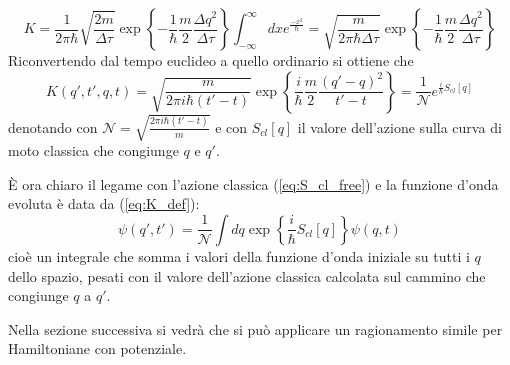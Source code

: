 $$
K = \frac{1}{2\pi\hbar}\sqrt{\frac{2m}{\Delta\tau}}\exp\left\{-\frac{1}{\hbar}\frac{m}{2}\frac{\Delta q^2}
{\Delta\tau} \right\} \int_{-\infty}^{\infty}dx e^{\frac{-x^2}{\hbar}} = \sqrt{\frac{m}{2\pi\hbar\Delta\tau}}
\exp\left\{-\frac{1}{\hbar}\frac{m}{2}\frac{\Delta q^2}{\Delta\tau}\right\}
$$
Riconvertendo dal tempo euclideo a quello ordinario si ottiene che
\begin{equation}
K(q',t',q,t) = \sqrt{\frac{m}{2\pi i\hbar(t'-t)}}\exp\left\{\frac{i}{\hbar}\frac{m}{2}
\frac{(q'-q)^2}{t'-t}\right\} = \frac{1}{\mathcal{N}}e^{\frac{i}{\hbar}S_{cl}[q]}
\label{eq:K_free}
\end{equation}
denotando con $\mathcal{N} = \sqrt{\frac{2\pi i\hbar (t'-t)}{m}}$ e con $S_{cl}[q]$ il valore dell'azione
sulla curva di moto classica che congiunge $q$ e $q'$.

È ora chiaro il legame con l'azione classica (\ref{eq:S_cl_free}) e la funzione d'onda evoluta è
data da (\ref{eq:K_def}):
$$\psi(q',t') = \frac{1}{\mathcal{N}}\int dq \exp\left\{\frac{i}{\hbar}S_{cl}[q]\right\}\psi(q,t)$$
cioè un integrale che somma i valori della funzione d'onda iniziale su tutti i $q$ dello spazio, pesati con
il valore dell'azione classica calcolata sul cammino che congiunge $q$ a $q'$.

Nella sezione successiva si vedrà che si può applicare un ragionamento simile per Hamiltoniane con
potenziale.
